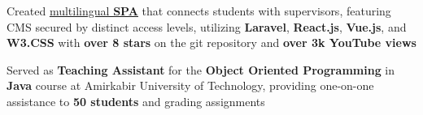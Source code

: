 \documentclass[10pt,A4]{article}
\begin{document}
\begin{paracol}{2}
\begin{rightcolumn}
{{{                Created \href{https://github.com/majhoolsoft/Ultimate-CMS-for-laboratory-webpage}{\underline{multilingual \textbf{SPA}}} that connects students with supervisors, featuring CMS secured by distinct access levels, utilizing \textbf{Laravel}, \textbf{React.js}, \textbf{Vue.js}, and \textbf{W3.CSS} with \textbf{over 8 stars} on the git repository and \textbf{over 3k YouTube views}
          }
          \item{
              Served as \textbf{Teaching Assistant} for the \textbf{Object Oriented Programming} in \textbf{Java} course at Amirkabir University of Technology, providing one-on-one assistance to \textbf{50 students} and grading assignments
          }
    }
}
\end{rightcolumn}
\end{paracol}
\end{document}
